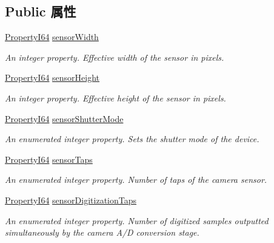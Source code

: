 \subsection*{Public 属性}
\begin{DoxyCompactItemize}
\item 
\hyperlink{group___common_interface_ga81749b2696755513663492664a18a893}{Property\+I64} \hyperlink{classmv_i_m_p_a_c_t_1_1acquire_1_1_gen_i_cam_1_1_image_format_control_a8d8306c00755dc6bdaf9ef5b74806a62}{sensor\+Width}
\begin{DoxyCompactList}\small\item\em An integer property. Effective width of the sensor in pixels. \end{DoxyCompactList}\item 
\hyperlink{group___common_interface_ga81749b2696755513663492664a18a893}{Property\+I64} \hyperlink{classmv_i_m_p_a_c_t_1_1acquire_1_1_gen_i_cam_1_1_image_format_control_af009ab8eff29c63d559ef2b7d01f4385}{sensor\+Height}
\begin{DoxyCompactList}\small\item\em An integer property. Effective height of the sensor in pixels. \end{DoxyCompactList}\item 
\hyperlink{group___common_interface_ga81749b2696755513663492664a18a893}{Property\+I64} \hyperlink{classmv_i_m_p_a_c_t_1_1acquire_1_1_gen_i_cam_1_1_image_format_control_ae184aeb41a502148279aa64314633ec7}{sensor\+Shutter\+Mode}
\begin{DoxyCompactList}\small\item\em An enumerated integer property. Sets the shutter mode of the device. \end{DoxyCompactList}\item 
\hyperlink{group___common_interface_ga81749b2696755513663492664a18a893}{Property\+I64} \hyperlink{classmv_i_m_p_a_c_t_1_1acquire_1_1_gen_i_cam_1_1_image_format_control_a061befe497a01e76983ba841c48fbbad}{sensor\+Taps}
\begin{DoxyCompactList}\small\item\em An enumerated integer property. Number of taps of the camera sensor. \end{DoxyCompactList}\item 
\hyperlink{group___common_interface_ga81749b2696755513663492664a18a893}{Property\+I64} \hyperlink{classmv_i_m_p_a_c_t_1_1acquire_1_1_gen_i_cam_1_1_image_format_control_aaeaaa96bce4671d14b71656f65e52749}{sensor\+Digitization\+Taps}
\begin{DoxyCompactList}\small\item\em An enumerated integer property. Number of digitized samples outputted simultaneously by the camera A/\+D conversion stage. \end{DoxyCompactList}\item 

\end{DoxyCompactItemize}
